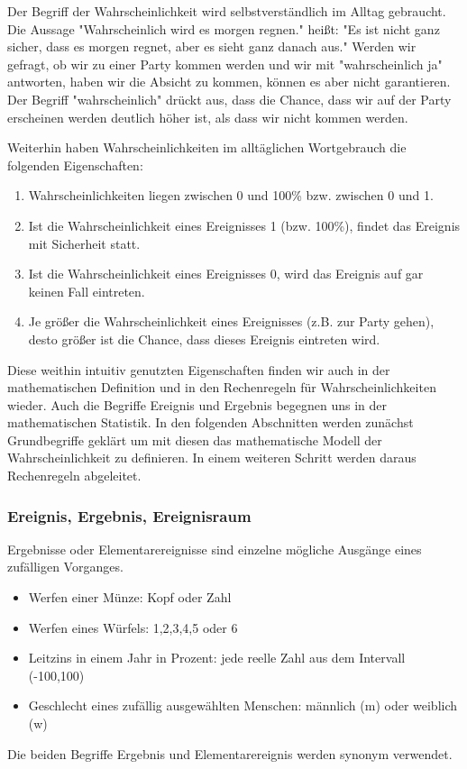 Der Begriff der Wahrscheinlichkeit wird selbstverständlich im Alltag gebraucht. Die Aussage "Wahrscheinlich wird es morgen regnen." heißt: "Es ist nicht ganz sicher, dass es morgen regnet, aber es sieht ganz danach aus." 
Werden wir gefragt, ob wir zu einer Party kommen werden und wir mit "wahrscheinlich ja" antworten, haben wir die Absicht zu kommen, können es aber nicht garantieren. Der Begriff "wahrscheinlich" drückt aus, dass die Chance, dass wir auf der Party erscheinen werden deutlich höher ist, als dass wir nicht kommen werden. 

Weiterhin haben Wahrscheinlichkeiten im alltäglichen Wortgebrauch die folgenden Eigenschaften:
\begin{enumerate}
	\item Wahrscheinlichkeiten liegen zwischen 0 und 100\%  bzw.  zwischen 0 und 1.
	\item Ist die Wahrscheinlichkeit eines Ereignisses 1 (bzw. 100\%), findet das Ereignis mit Sicherheit statt.
	\item Ist die Wahrscheinlichkeit eines Ereignisses 0, wird das Ereignis auf gar keinen Fall eintreten.
	\item Je größer die Wahrscheinlichkeit eines Ereignisses (z.B. zur Party gehen), desto größer ist die Chance, dass dieses Ereignis eintreten wird.
\end{enumerate}

Diese weithin intuitiv genutzten Eigenschaften finden wir auch in der mathematischen Definition und in den Rechenregeln für Wahrscheinlichkeiten wieder. Auch die Begriffe Ereignis und Ergebnis begegnen uns in der mathematischen Statistik. In den folgenden Abschnitten werden zunächst Grundbegriffe geklärt um mit diesen  das mathematische Modell der Wahrscheinlichkeit zu definieren. In einem weiteren Schritt werden daraus Rechenregeln abgeleitet.
 
\subsubsection{Ereignis, Ergebnis, Ereignisraum}
Ergebnisse oder Elementarereignisse sind einzelne mögliche Ausgänge eines zufälligen Vorganges. 
	\begin{itemize}
		\item Werfen einer Münze: Kopf oder Zahl
		\item Werfen eines Würfels: 1,2,3,4,5 oder 6
		\item Leitzins in einem Jahr in Prozent: jede reelle Zahl aus dem Intervall (-100,100)
		\item Geschlecht eines zufällig ausgewählten Menschen: männlich (m) oder weiblich (w)
	\end{itemize}
Die beiden Begriffe Ergebnis und Elementarereignis werden synonym verwendet.

